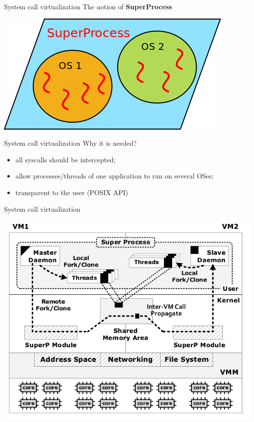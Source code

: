 \documentclass{beamer}
\begin{document}
\begin{frame}[t]{System call virtualization}
  The notion of \textbf{SuperProcess}
  \newline
  \begin{center}
    \includegraphics[scale=0.5]{SuperProcess.png}
  \end{center}
\end{frame}

\begin{frame}{System call virtualization}
  Why it is needed?
  \begin{itemize}
    \item all syscalls should be intercepted;
    \item allow processes/threads of one application to run on several
      OSes;
    \item transparent to the user (POSIX API)
  \end{itemize}
\end{frame}

\begin{frame}{System call virtualization}
  \begin{center}
    \includegraphics[scale=0.4]{adv_architecture.png}
  \end{center}
\end{frame}
\end{document}
